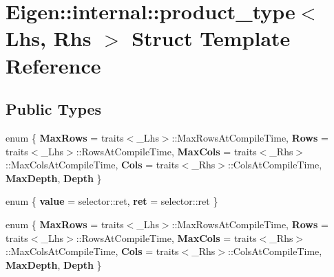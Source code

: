 \hypertarget{struct_eigen_1_1internal_1_1product__type}{}\section{Eigen\+:\+:internal\+:\+:product\+\_\+type$<$ Lhs, Rhs $>$ Struct Template Reference}
\label{struct_eigen_1_1internal_1_1product__type}
\subsection*{Public Types}
\begin{DoxyCompactItemize}
\item 
\mbox{\label{struct_eigen_1_1internal_1_1product__type_ac860dbb478858488ddd5928b23218712}} 
enum \{ \newline
{\bfseries Max\+Rows} = traits$<$\+\_\+\+Lhs$>$\+:\+:Max\+Rows\+At\+Compile\+Time, 
{\bfseries Rows} = traits$<$\+\_\+\+Lhs$>$\+:\+:Rows\+At\+Compile\+Time, 
{\bfseries Max\+Cols} = traits$<$\+\_\+\+Rhs$>$\+:\+:Max\+Cols\+At\+Compile\+Time, 
{\bfseries Cols} = traits$<$\+\_\+\+Rhs$>$\+:\+:Cols\+At\+Compile\+Time, 
\newline
{\bfseries Max\+Depth}, 
{\bfseries Depth}
 \}
\item 
\mbox{\label{struct_eigen_1_1internal_1_1product__type_a7a7feedbcc011735f444805308639ee4}} 
enum \{ {\bfseries value} = selector\+:\+:ret, 
{\bfseries ret} = selector\+:\+:ret
 \}
\item 
\mbox{\label{struct_eigen_1_1internal_1_1product__type_ad41efa37cf082df6ffa09ecbc3e0f6de}} 
enum \{ \newline
{\bfseries Max\+Rows} = traits$<$\+\_\+\+Lhs$>$\+:\+:Max\+Rows\+At\+Compile\+Time, 
{\bfseries Rows} = traits$<$\+\_\+\+Lhs$>$\+:\+:Rows\+At\+Compile\+Time, 
{\bfseries Max\+Cols} = traits$<$\+\_\+\+Rhs$>$\+:\+:Max\+Cols\+At\+Compile\+Time, 
{\bfseries Cols} = traits$<$\+\_\+\+Rhs$>$\+:\+:Cols\+At\+Compile\+Time, 
\newline
{\bfseries Max\+Depth}, 
{\bfseries Depth}
 \}
\item 
\mbox{\label{struct_eigen_1_1internal_1_1product__type_aa79eab35bf013aa587be4cbf67fd56fd}} 

\end{DoxyCompactItemize}
